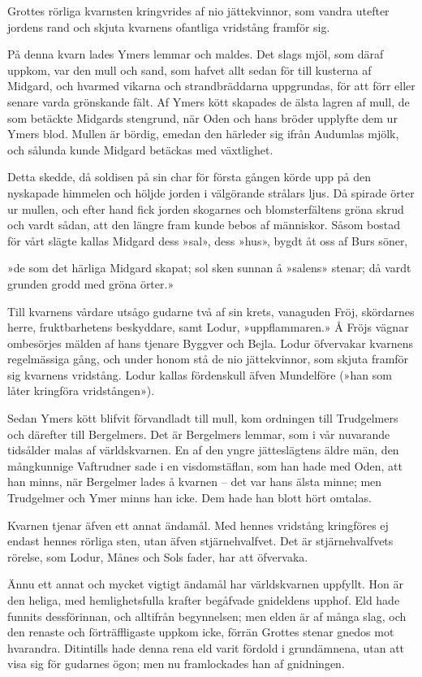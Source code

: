 Grottes rörliga kvarnsten kringvrides af nio jättekvinnor, som vandra
utefter jordens rand och skjuta kvarnens ofantliga vridstång framför
sig.

På denna kvarn lades Ymers lemmar och maldes. Det slags mjöl, som däraf
uppkom, var den mull och sand, som hafvet allt sedan för till kusterna
af Midgard, och hvarmed vikarna och strandbräddarna uppgrundas, för att
förr eller senare varda grönskande fält. Af Ymers kött skapades de älsta
lagren af mull, de som betäckte Midgards stengrund, när Oden och hans
bröder upplyfte dem ur Ymers blod. Mullen är bördig, emedan den härleder
sig ifrån Audumlas mjölk, och sålunda kunde Midgard betäckas med
växtlighet.

Detta skedde, då soldisen på sin char för första gången körde upp på den
nyskapade himmelen och höljde jorden i välgörande strålars ljus. Då
spirade örter ur mullen, och efter hand fick jorden skogarnes och
blomsterfältens gröna skrud och vardt sådan, att den längre fram kunde
bebos af människor. Såsom bostad för vårt slägte kallas Midgard dess
»sal», dess »hus», bygdt åt oss af Burs söner,

{»de som det härliga}
{Midgard skapat;}
{sol sken sunnan}
{å »salens» stenar;}
{då vardt grunden grodd}
{med gröna örter.»}

Till kvarnens vårdare utsågo gudarne två af sin krets, vanaguden Fröj,
skördarnes herre, fruktbarhetens beskyddare, samt Lodur, »uppflammaren.»
Å Fröjs vägnar ombesörjes mälden af hans tjenare Byggver och Bejla.
Lodur öfvervakar kvarnens regelmässiga gång, och under honom stå de
nio jättekvinnor, som skjuta framför sig kvarnens vridstång. Lodur
kallas fördenskull äfven Mundelföre (»han som låter kringföra
vridstången»).

Sedan Ymers kött blifvit förvandladt till mull, kom ordningen till
Trudgelmers och därefter till Bergelmers. Det är Bergelmers lemmar, som
i vår nuvarande tidsålder malas af världskvarnen. En af den yngre
jätteslägtens äldre män, den mångkunnige Vaftrudner sade i en
visdomstäflan, som han hade med Oden, att han minns, när Bergelmer lades
å kvarnen -- det var hans älsta minne; men Trudgelmer och Ymer minns han
icke. Dem hade han blott hört omtalas.

Kvarnen tjenar äfven ett annat ändamål. Med hennes vridstång kringföres
ej endast hennes rörliga sten, utan äfven stjärnehvalfvet. Det är
stjärnehvalfvets rörelse, som Lodur, Månes och Sols fader, har att
öfvervaka.

Ännu ett annat och mycket vigtigt ändamål har världskvarnen uppfyllt.
Hon är den heliga, med hemlighetsfulla krafter begåfvade gnideldens
upphof. Eld hade funnits dessförinnan, och alltifrån begynnelsen; men
elden är af många slag, och den renaste och förträffligaste uppkom icke,
förrän Grottes stenar gnedos mot hvarandra. Ditintills hade denna rena
eld varit fördold i grundämnena, utan att visa sig för gudarnes ögon;
men nu framlockades han af gnidningen.

